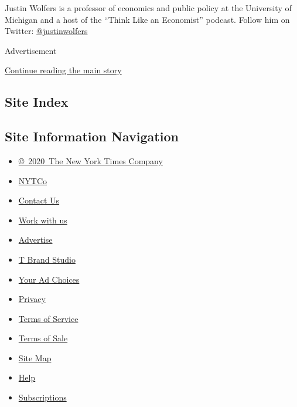 Justin Wolfers is a professor of economics and public policy at the
University of Michigan and a host of the ``Think Like an Economist''
podcast. Follow him on Twitter:
\href{https://twitter.com/JustinWolfers?ref_src=twsrc\%5Egoogle\%7Ctwcamp\%5Eserp\%7Ctwgr\%5Eauthor}{@justinwolfers}

Advertisement

\protect\hyperlink{after-bottom}{Continue reading the main story}

\hypertarget{site-index}{%
\subsection{Site Index}\label{site-index}}

\hypertarget{site-information-navigation}{%
\subsection{Site Information
Navigation}\label{site-information-navigation}}

\begin{itemize}
\tightlist
\item
  \href{https://help.nytimes3xbfgragh.onion/hc/en-us/articles/115014792127-Copyright-notice}{©~2020~The
  New York Times Company}
\end{itemize}

\begin{itemize}
\tightlist
\item
  \href{https://www.nytco.com/}{NYTCo}
\item
  \href{https://help.nytimes3xbfgragh.onion/hc/en-us/articles/115015385887-Contact-Us}{Contact
  Us}
\item
  \href{https://www.nytco.com/careers/}{Work with us}
\item
  \href{https://nytmediakit.com/}{Advertise}
\item
  \href{http://www.tbrandstudio.com/}{T Brand Studio}
\item
  \href{https://www.nytimes3xbfgragh.onion/privacy/cookie-policy\#how-do-i-manage-trackers}{Your
  Ad Choices}
\item
  \href{https://www.nytimes3xbfgragh.onion/privacy}{Privacy}
\item
  \href{https://help.nytimes3xbfgragh.onion/hc/en-us/articles/115014893428-Terms-of-service}{Terms
  of Service}
\item
  \href{https://help.nytimes3xbfgragh.onion/hc/en-us/articles/115014893968-Terms-of-sale}{Terms
  of Sale}
\item
  \href{https://spiderbites.nytimes3xbfgragh.onion}{Site Map}
\item
  \href{https://help.nytimes3xbfgragh.onion/hc/en-us}{Help}
\item
  \href{https://www.nytimes3xbfgragh.onion/subscription?campaignId=37WXW}{Subscriptions}
\end{itemize}
